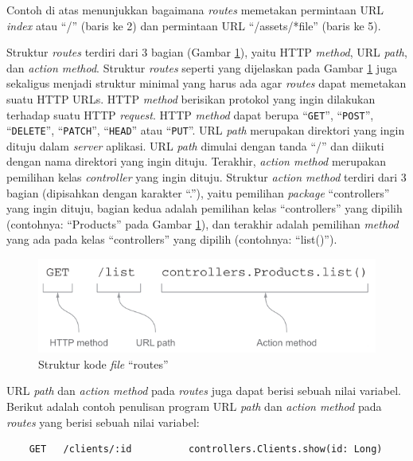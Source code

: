 Contoh di atas menunjukkan bagaimana \textit{routes} memetakan permintaan URL \textit{index} atau ``/'' (baris ke 2) dan permintaan URL ``/assets/*file'' (baris ke 5).

Struktur \textit{routes} terdiri dari 3 bagian (Gambar \ref{fig:2_routes}), yaitu HTTP \textit{method}, URL \textit{path}, dan \textit{action method}. Struktur \textit{routes} seperti yang dijelaskan pada Gambar \ref{fig:2_routes} juga sekaligus menjadi struktur minimal yang harus ada agar \textit{routes} dapat memetakan suatu HTTP URLs. HTTP \textit{method} berisikan protokol yang ingin dilakukan terhadap suatu HTTP \textit{request}. HTTP \textit{method} dapat berupa ``\texttt{GET}'', ``\texttt{POST}'', ``\texttt{DELETE}'', ``\texttt{PATCH}'', ``\texttt{HEAD}'' atau ``\texttt{PUT}''\cite{playframeworkweb}. URL \textit{path} merupakan direktori yang ingin dituju dalam \textit{server} aplikasi. URL \textit{path} dimulai dengan tanda ``/'' dan diikuti dengan nama direktori yang ingin dituju. Terakhir, \textit{action method} merupakan pemilihan kelas \textit{controller} yang ingin dituju. Struktur \textit{action method} terdiri dari 3 bagian (dipisahkan dengan karakter ``.''), yaitu pemilihan \textit{package} ``controllers'' yang ingin dituju, bagian kedua adalah pemilihan kelas ``controllers'' yang dipilih (contohnya: ``Products'' pada Gambar \ref{fig:2_routes}), dan terakhir adalah pemilihan \textit{method} yang ada pada kelas ``controllers'' yang dipilih (contohnya: ``list()'').

\begin{figure}[htbp]
	\centering
		\includegraphics[scale=0.8]{Gambar/2_routes.PNG}
	\caption{Struktur kode \textit{file} ``routes''\cite{playforjava}}
	\label{fig:2_routes}
\end{figure}

URL \textit{path} dan \textit{action method} pada \textit{routes} juga dapat berisi sebuah nilai variabel. Berikut adalah contoh penulisan program URL \textit{path} dan \textit{action method} pada \textit{routes} yang berisi sebuah nilai variabel:

\begin{lstlisting}
	GET   /clients/:id          controllers.Clients.show(id: Long)
\end{lstlisting}


